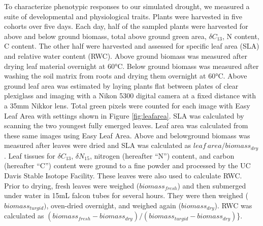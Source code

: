 \documentclass[jou,floatsintext]{apa6}
\begin{document}
To characterize phenotypic responses to our simulated drought, we measured a suite of developmental and physiological traits. Plants were harvested in five cohorts over five days. Each day, half of the sampled plants were harvested for above and below ground biomass, total above ground green area, \(\delta C_{13}\), N content, C content. The other half were harvested and assessed for specific leaf area (SLA) and relative water content (RWC). Above ground biomass was measured after drying leaf material overnight at 60°C. Below ground biomass was measured after washing the soil matrix from roots and drying them overnight at 60°C. Above ground leaf area was estimated by laying plants flat between plates of clear plexiglass and imaging with a Nikon 5300 digital camera at a fixed distance with a 35mm Nikkor lens. Total green pixels were counted for each image with Easy Leaf Area with settings shown in Figure \ref{fig:leafarea}. SLA was calculated by scanning the two youngest fully emerged leaves. Leaf area was calculated from these same images using Easy Leaf Area. Above and belowground biomass was measured after leaves were dried and SLA was calculated as \(leaf\ area / biomass_{dry}\). Leaf tissues for \(\delta C_{13}\), \(\delta N_{15}\), nitrogen (hereafter \enquote{N}) content, and carbon (hereafter \enquote{C}) content were ground to a fine powder and processed by the UC Davis Stable Isotope Facility. These leaves were also used to calculate RWC. Prior to drying, fresh leaves were weighed (\(biomass_{fresh}\)) and then submerged under water in 15mL falcon tubes for several hours. They were then weighed (\(biomass_{turgid})\), oven-dried overnight, and weighed again (\(biomass_{dry}\)). RWC was calculated as \((biomass_{fresh}-biomass_{dry})/(biomass_{turgid}-biomass_{dry})\)\}.
\end{document}
